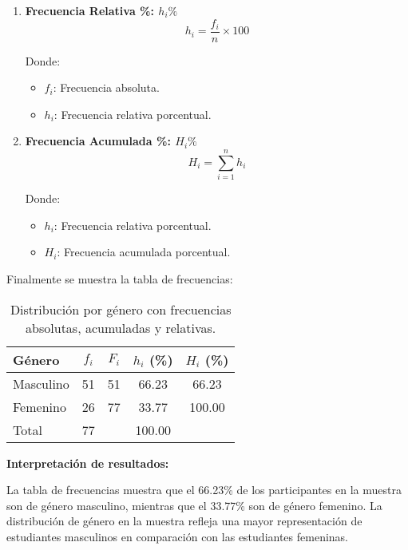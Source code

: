 \begin{multicols}{2}
\begin{enumerate}
    \item \begin{center}
      \textbf{Frecuencia Relativa \%: $h_i\%$}
      \hrulefill
      \begin{equation*}
        h_i = \frac{f_i}{n} \times 100
      \end{equation*}
    \end{center}
    \vspace{-1cm}
    Donde:
    \begin{itemize}
        \item $f_i$: Frecuencia absoluta.
        \item $h_i$: Frecuencia relativa porcentual.
    \end{itemize}

    \item \begin{center}
      \textbf{Frecuencia Acumulada \%: $H_i\%$}
      \hrulefill
      \begin{equation*}
        H_i = \sum_{i=1}^{n} h_i
      \end{equation*}
    \end{center}
    \vspace{-1cm}
    Donde:
    \begin{itemize}
        \item $h_i$: Frecuencia relativa porcentual.
        \item $H_i$: Frecuencia acumulada porcentual.
    \end{itemize}
    \end{enumerate}
  \end{multicols}
  \vspace{-0.5cm}
  Finalmente se muestra la tabla de frecuencias:

  \renewcommand{\arraystretch}{1.5} %
\begin{table}[ht]
    \centering
    \begin{tabular}{l @{\hskip 0.5cm} c @{\hskip 0.5cm} c @{\hskip 0.5cm} c @{\hskip 0.5cm} c}
      \hline
      \textbf{Género} & \textbf{$f_i$} & \textbf{$F_i$} & \textbf{$h_i$ (\%)} & \textbf{$H_i$ (\%)} \\ \hline
      Masculino       & 51             & 51             & 66.23               & 66.23               \\ \hline
      Femenino        & 26             & 77             & 33.77               & 100.00              \\ \hline
      Total           & 77             &                & 100.00              &                     \\
    \end{tabular}
    \caption{Distribución por género con frecuencias absolutas, acumuladas y relativas.}
    \label{tab:genero-frecuencias}
\end{table}

\textbf{Interpretación de resultados:}

La tabla de frecuencias muestra que el 66.23\% de los participantes en la muestra son de género masculino, mientras que el 33.77\% son de género femenino. La distribución de género en la muestra refleja una mayor representación de estudiantes masculinos en comparación con las estudiantes femeninas.